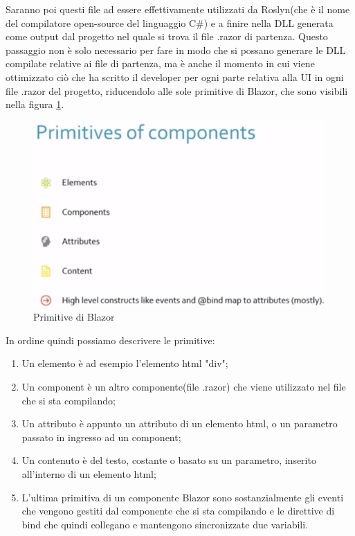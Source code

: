 Saranno poi questi file ad essere effettivamente utilizzati da Roslyn(che \`e il nome del compilatore open-source del linguaggio C\#) e a finire nella DLL generata come output dal progetto nel quale si trova il file .razor di partenza.
Questo passaggio non \`e solo necessario per fare in modo che si possano generare le DLL compilate relative ai file di partenza, ma \`e anche il momento in cui viene ottimizzato ci\`o che ha scritto il developer per ogni parte relativa alla UI in ogni file .razor del progetto, riducendolo alle sole primitive di Blazor, che sono visibili nella figura \ref{fig:BlazorPrimitives}.

\begin{figure}[H]
	\centerline{\includegraphics[scale=0.7]{figure/BlazorPrimitives.PNG}}
	\caption{Primitive di Blazor}
	\label{fig:BlazorPrimitives}
\end{figure}

In ordine quindi possiamo descrivere le primitive:
\begin{enumerate}
	\item Un elemento \`e ad esempio l'elemento html "div";
	\item Un component \`e un altro componente(file .razor) che viene utilizzato nel file che si sta compilando;
	\item Un attributo \`e appunto un attributo di un elemento html, o un parametro passato in ingresso ad un component;
	\item Un contenuto \`e del testo, costante o basato su un parametro, inserito all'interno di un elemento html;
	\item L'ultima primitiva di un componente Blazor sono sostanzialmente gli eventi che vengono gestiti dal componente che si sta compilando e le direttive di bind che quindi collegano e mantengono sincronizzate due variabili.
\end{enumerate}

\pagebreak